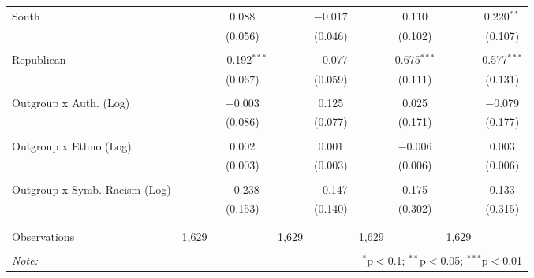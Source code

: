 \begin{table}[H]
{\begin{tabular}{@{\extracolsep{5pt}}lcccccccc}
 South &  & 0.088 &  & $-$0.017 &  & 0.110 &  & 0.220$^{**}$ \\ 
  &  & (0.056) &  & (0.046) &  & (0.102) &  & (0.107) \\ 
  & & & & & & & & \\ 
 Republican &  & $-$0.192$^{***}$ &  & $-$0.077 &  & 0.675$^{***}$ &  & 0.577$^{***}$ \\ 
  &  & (0.067) &  & (0.059) &  & (0.111) &  & (0.131) \\ 
  & & & & & & & & \\ 
 Outgroup x Auth. (Log) &  & $-$0.003 &  & 0.125 &  & 0.025 &  & $-$0.079 \\ 
  &  & (0.086) &  & (0.077) &  & (0.171) &  & (0.177) \\ 
  & & & & & & & & \\ 
 Outgroup x Ethno (Log) &  & 0.002 &  & 0.001 &  & $-$0.006 &  & 0.003 \\ 
  &  & (0.003) &  & (0.003) &  & (0.006) &  & (0.006) \\ 
  & & & & & & & & \\ 
 Outgroup x Symb. Racism (Log) &  & $-$0.238 &  & $-$0.147 &  & 0.175 &  & 0.133 \\ 
  &  & (0.153) &  & (0.140) &  & (0.302) &  & (0.315) \\ 
  & & & & & & & & \\ 
\hline \\[-1.8ex] 
Observations & 1,629 &  & 1,629 &  & 1,629 &  & 1,629 &  \\ 
\hline 
\hline \\[-1.8ex] 
\textit{Note:}  & \multicolumn{8}{r}{$^{*}$p$<$0.1; $^{**}$p$<$0.05; $^{***}$p$<$0.01} \\ 
\end{tabular}} 
\end{table} 
